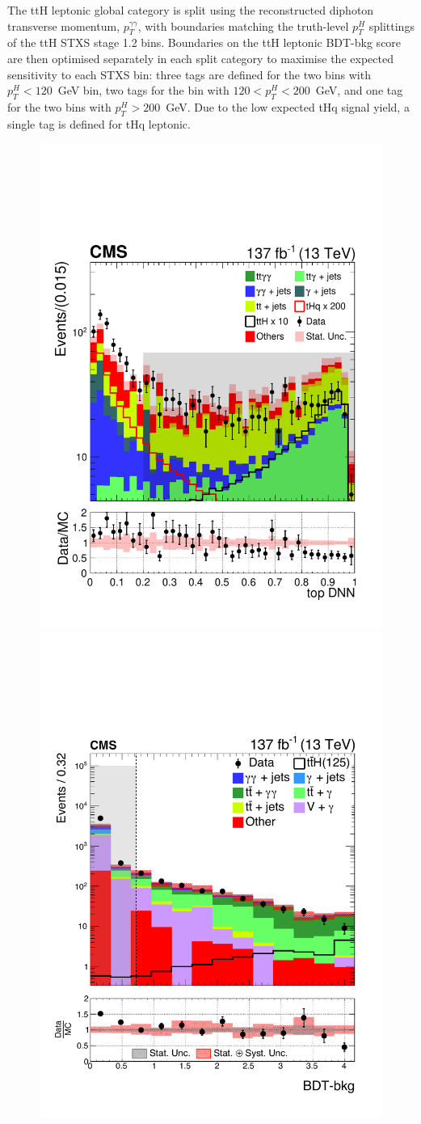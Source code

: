 The ttH leptonic global category is split using the reconstructed diphoton transverse momentum, $p_T^{\gamma\gamma}$, with boundaries matching the truth-level $p_T^H$ splittings of the ttH STXS stage 1.2 bins. Boundaries on the ttH leptonic BDT-bkg score are then optimised separately in each split category to maximise the expected sensitivity to each STXS bin: three tags are defined for the two bins with $p_T^H<120$~GeV bin, two tags for the bin with $120<p_T^H<200$~GeV, and one tag for the two bins with $p_T^H>200$~GeV. Due to the low expected tHq signal yield, a single tag is defined for tHq leptonic.

\begin{figure}[htb]
  \centering
  \includegraphics[width=.49\textwidth]{Figures/hgg_overview/tHq_DNN_score.pdf}
  \hfill
  \includegraphics[width=.49\textwidth]{Figures/hgg_overview/ttHLeptonic_MVA.pdf}

\end{figure}
